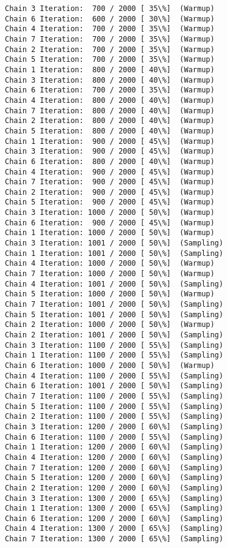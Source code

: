\documentclass[11pt]{article}
\begin{document}
\begin{Verbatim}[commandchars=\\\{\}]
Chain 3 Iteration:  700 / 2000 [ 35\%]  (Warmup)
Chain 6 Iteration:  600 / 2000 [ 30\%]  (Warmup)
Chain 4 Iteration:  700 / 2000 [ 35\%]  (Warmup)
Chain 7 Iteration:  700 / 2000 [ 35\%]  (Warmup)
Chain 2 Iteration:  700 / 2000 [ 35\%]  (Warmup)
Chain 5 Iteration:  700 / 2000 [ 35\%]  (Warmup)
Chain 1 Iteration:  800 / 2000 [ 40\%]  (Warmup)
Chain 3 Iteration:  800 / 2000 [ 40\%]  (Warmup)
Chain 6 Iteration:  700 / 2000 [ 35\%]  (Warmup)
Chain 4 Iteration:  800 / 2000 [ 40\%]  (Warmup)
Chain 7 Iteration:  800 / 2000 [ 40\%]  (Warmup)
Chain 2 Iteration:  800 / 2000 [ 40\%]  (Warmup)
Chain 5 Iteration:  800 / 2000 [ 40\%]  (Warmup)
Chain 1 Iteration:  900 / 2000 [ 45\%]  (Warmup)
Chain 3 Iteration:  900 / 2000 [ 45\%]  (Warmup)
Chain 6 Iteration:  800 / 2000 [ 40\%]  (Warmup)
Chain 4 Iteration:  900 / 2000 [ 45\%]  (Warmup)
Chain 7 Iteration:  900 / 2000 [ 45\%]  (Warmup)
Chain 2 Iteration:  900 / 2000 [ 45\%]  (Warmup)
Chain 5 Iteration:  900 / 2000 [ 45\%]  (Warmup)
Chain 3 Iteration: 1000 / 2000 [ 50\%]  (Warmup)
Chain 6 Iteration:  900 / 2000 [ 45\%]  (Warmup)
Chain 1 Iteration: 1000 / 2000 [ 50\%]  (Warmup)
Chain 3 Iteration: 1001 / 2000 [ 50\%]  (Sampling)
Chain 1 Iteration: 1001 / 2000 [ 50\%]  (Sampling)
Chain 4 Iteration: 1000 / 2000 [ 50\%]  (Warmup)
Chain 7 Iteration: 1000 / 2000 [ 50\%]  (Warmup)
Chain 4 Iteration: 1001 / 2000 [ 50\%]  (Sampling)
Chain 5 Iteration: 1000 / 2000 [ 50\%]  (Warmup)
Chain 7 Iteration: 1001 / 2000 [ 50\%]  (Sampling)
Chain 5 Iteration: 1001 / 2000 [ 50\%]  (Sampling)
Chain 2 Iteration: 1000 / 2000 [ 50\%]  (Warmup)
Chain 2 Iteration: 1001 / 2000 [ 50\%]  (Sampling)
Chain 3 Iteration: 1100 / 2000 [ 55\%]  (Sampling)
Chain 1 Iteration: 1100 / 2000 [ 55\%]  (Sampling)
Chain 6 Iteration: 1000 / 2000 [ 50\%]  (Warmup)
Chain 4 Iteration: 1100 / 2000 [ 55\%]  (Sampling)
Chain 6 Iteration: 1001 / 2000 [ 50\%]  (Sampling)
Chain 7 Iteration: 1100 / 2000 [ 55\%]  (Sampling)
Chain 5 Iteration: 1100 / 2000 [ 55\%]  (Sampling)
Chain 2 Iteration: 1100 / 2000 [ 55\%]  (Sampling)
Chain 3 Iteration: 1200 / 2000 [ 60\%]  (Sampling)
Chain 6 Iteration: 1100 / 2000 [ 55\%]  (Sampling)
Chain 1 Iteration: 1200 / 2000 [ 60\%]  (Sampling)
Chain 4 Iteration: 1200 / 2000 [ 60\%]  (Sampling)
Chain 7 Iteration: 1200 / 2000 [ 60\%]  (Sampling)
Chain 5 Iteration: 1200 / 2000 [ 60\%]  (Sampling)
Chain 2 Iteration: 1200 / 2000 [ 60\%]  (Sampling)
Chain 3 Iteration: 1300 / 2000 [ 65\%]  (Sampling)
Chain 1 Iteration: 1300 / 2000 [ 65\%]  (Sampling)
Chain 6 Iteration: 1200 / 2000 [ 60\%]  (Sampling)
Chain 4 Iteration: 1300 / 2000 [ 65\%]  (Sampling)
Chain 7 Iteration: 1300 / 2000 [ 65\%]  (Sampling)

\end{Verbatim}
\end{document}
